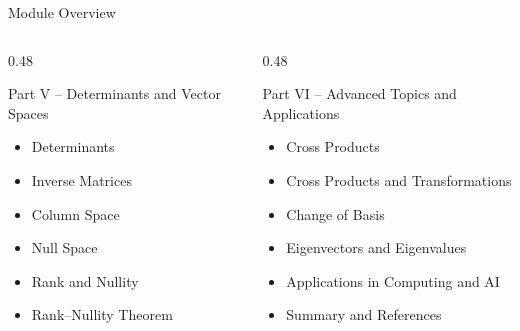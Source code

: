 \documentclass[aspectratio=169,12pt]{beamer}
\begin{document}

\begin{frame}{Module Overview}

\begin{columns}[T,totalwidth=\textwidth]

\begin{column}{0.48\textwidth}

\begin{block}{Part V -- Determinants and Vector Spaces}

\begin{itemize}
    \item Determinants
    \item Inverse Matrices
    \item Column Space
    \item Null Space
    \item Rank and Nullity
    \item Rank--Nullity Theorem
\end{itemize}

\end{block}

\end{column}

\begin{column}{0.48\textwidth}

\begin{block}{Part VI -- Advanced Topics and Applications}

\begin{itemize}
    \item Cross Products
    \item Cross Products and Transformations
    \item Change of Basis
    \item Eigenvectors and Eigenvalues
    \item Applications in Computing and AI
    \item Summary and References
\end{itemize}

\end{block}

\end{column}

\end{columns}

\end{frame}
\end{document}
